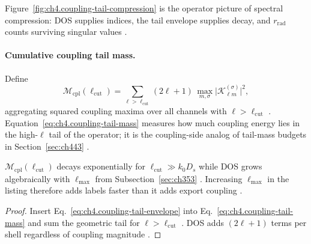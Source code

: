 Figure~\ref{fig:ch4.coupling-tail-compression} is the operator picture of spectral compression: DOS supplies indices, the tail envelope
supplies decay, and \(r_{\mathrm{rad}}\) counts surviving singular values \cite{hansen1988,harrington2001,devaney2004}.

\paragraph{Cumulative coupling tail mass.}
Define
\begin{equation}
\label{eq:ch4.coupling-tail-mass}
\mathcal{M}_{\mathrm{cpl}}(\ell_{\mathrm{cut}})
=
\sum_{\ell>\ell_{\mathrm{cut}}}(2\ell+1)\,
\max_{m,\sigma}\big|\mathcal{K}_{\ell m}^{(\sigma)}\big|^{2},
\end{equation}
aggregating squared coupling maxima over all channels with \(\ell>\ell_{\mathrm{cut}}\) \cite{hansen1988,stratton1941}. Equation~\eqref{eq:ch4.coupling-tail-mass}
measures how much coupling energy lies in the high-\(\ell\) tail of the operator; it is the coupling-side analog of tail-mass budgets in
Section~\ref{sec:ch443} \cite{harrington2001,devaney2004,jackson1999}.

\begin{proposition}
\label{prop:ch4.coupling-tail-dos}
\(\mathcal{M}_{\mathrm{cpl}}(\ell_{\mathrm{cut}})\) decays exponentially for \(\ell_{\mathrm{cut}}\gg k_{0}D_{s}\) while DOS grows
algebraically with \(\ell_{\max}\) from Subsection~\ref{sec:ch353} \cite{hansen1988,stratton1941,harrington2001}. Increasing
\(\ell_{\max}\) in the listing therefore adds labels faster than it adds export coupling \cite{devaney2004,collin2001}.
\end{proposition}
\begin{proof}
Insert Eq.~\eqref{eq:ch4.coupling-tail-envelope} into Eq.~\eqref{eq:ch4.coupling-tail-mass} and sum the geometric tail for
\(\ell>\ell_{\mathrm{cut}}\) \cite{hansen1988,stratton1941}. DOS adds \((2\ell+1)\) terms per shell regardless of coupling magnitude
\cite{jackson1999,harrington2001}.
\end{proof}


